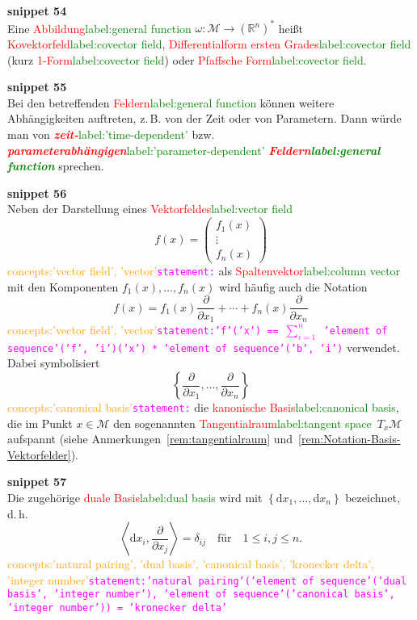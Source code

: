 \documentclass[a4paper,twoside,english,ngerman,deutsch,german,sectrefs,envcountsame,envcountchap]{svmono}
\newcommand{\setref}[2]{\textcolor{red}{#1}\textcolor{green}{#2}}
\newcommand{\snippet}[1]{\textbf{snippet #1}\\}
\newcommand{\eqnote}[2]{\textcolor{orange}{#1}\textcolor{magenta}{\texttt{#2}}}
\begin{document}
\snippet{54}
Eine \setref{Abbildung}{label:general function} $\omega:\mathcal{M}\to({\mathbb{R}}^{n})^{*}$ heißt \setref{Kovektorfeld}{label:covector field}, \setref{Differentialform ersten Grades}{label:covector field}
(kurz \setref{1-Form}{label:covector field}) oder \setref{Pfaffsche Form}{label:covector field}.

\snippet{55}
Bei den betreffenden
\setref{Feldern}{label:general function} können weitere Abhängigkeiten auftreten, z.\,B. von der Zeit
oder von Parametern. Dann würde man von \setref{\textbf{\em zeit-}}{label:'time-dependent'} bzw. \setref{\textbf{\em parameterabhängigen}}{label:'parameter-dependent'}
\textbf{\em \setref{Feldern}{label:general function}} sprechen.

\snippet{56}

Neben der Darstellung eines \setref{Vektorfeldes}{label:vector field}
\[
f(x)=\left(\begin{array}{c}
f_{1}(x)\\
\vdots\\
f_{n}(x)
\end{array}\right)
\]\eqnote{concepts:'vector field', 'vector'}{statement:{}}
als \setref{Spaltenvektor}{label:column vector} mit den Komponenten $f_{1}(x),\ldots,f_{n}(x)$
wird häufig auch die Notation
\begin{equation}
f(x)=f_{1}(x)\frac{\partial}{\partial x_{1}}+\cdots+f_{n}(x)\frac{\partial}{\partial x_{n}}\label{eq:Basisdarstellung-Vektorfelder}
\end{equation}\eqnote{concepts:'vector field', 'vector'}{statement:'f'('x') == $\sum_{i=1}^n$ 'element of sequence'('f', 'i')('x') * 'element of sequence'('b', 'i')}
verwendet.
Dabei symbolisiert
\begin{equation}
\left\{ \frac{\partial}{\partial x_{1}},\ldots,\frac{\partial}{\partial x_{n}}\right\} \label{eq:Basisvektorfelder}
\end{equation}\eqnote{concepts:'canonical basis'}{statement:}
die \setref{kanonische Basis}{label:canonical basis}, die im Punkt $x\in\mathcal{M}$ den sogenannten
\setref{Tangential\-raum}{label:tangent space}~$T_{x}\mathcal{M}$
aufspannt (siehe Anmerkungen~\ref{rem:tangentialraum} und~\ref{rem:Notation-Basis-Vektorfelder}).

\snippet{57}
Die zugehörige \setref{duale Basis}{label:dual basis} wird mit $\left\{ {\mathrm{d}} x_{1},\dots,{\mathrm{d}} x_{n}\right\} $
bezeichnet, d.\,h.
\[
\left\langle {\mathrm{d}} x_{i},\frac{\partial}{\partial x_{j}}\right\rangle =\delta_{ij}\quad\textrm{für}\quad1\leq i,j\leq n.
\]\eqnote{concepts:'natural pairing', 'dual basis', 'canonical basis', 'kronecker delta', 'integer number'}{statement:'natural pairing'('element of sequence'('dual basis', 'integer number'), 'element of sequence'('canonical basis', 'integer number')) = 'kronecker delta'}
\end{document}
